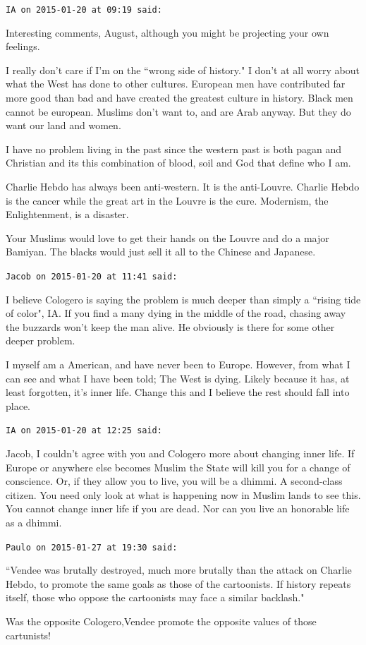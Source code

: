 \begin{footnotesize}
\begin{sffamily}
\hfill

\texttt{IA on 2015-01-20 at 09:19 said: }

Interesting comments, August, although you might be projecting your own feelings.

I really don't care if I'm on the ``wrong side of history." I don't at all worry about what the West has done to other cultures. European men have contributed far more good than bad and have created the greatest culture in history. Black men cannot be european. Muslims don't want to, and are Arab anyway. But they do want our land and women.

I have no problem living in the past since the western past is both pagan and Christian and its this combination of blood, soil and God that define who I am. 

Charlie Hebdo has always been anti-western. It is the anti-Louvre. Charlie Hebdo is the cancer while the great art in the Louvre is the cure. Modernism, the Enlightenment, is a disaster.

Your Muslims would love to get their hands on the Louvre and do a major Bamiyan. The blacks would just sell it all to the Chinese and Japanese.


\hfill

\texttt{Jacob on 2015-01-20 at 11:41 said: }

I believe Cologero is saying the problem is much deeper than simply a ``rising tide of color", IA. If you find a many dying in the middle of the road, chasing away the buzzards won't keep the man alive. He obviously is there for some other deeper problem. 

I myself am a American, and have never been to Europe. However, from what I can see and what I have been told; The West is dying. Likely because it has, at least forgotten, it's inner life. Change this and I believe the rest should fall into place.


\hfill

\texttt{IA on 2015-01-20 at 12:25 said: }

Jacob, I couldn't agree with you and Cologero more about changing inner life. If Europe or anywhere else becomes Muslim the State will kill you for a change of conscience. Or, if they allow you to live, you will be a dhimmi. A second-class citizen. You need only look at what is happening now in Muslim lands to see this. You cannot change inner life if you are dead. Nor can you live an honorable life as a dhimmi.


\hfill

\texttt{Paulo on 2015-01-27 at 19:30 said: }

``Vendee was brutally destroyed, much more brutally than the attack on Charlie Hebdo, to promote the same goals as those of the cartoonists. If history repeats itself, those who oppose the cartoonists may face a similar backlash."

Was the opposite Cologero,Vendee promote the opposite values of those cartunists!


\hfill


\end{sffamily}\end{footnotesize}
